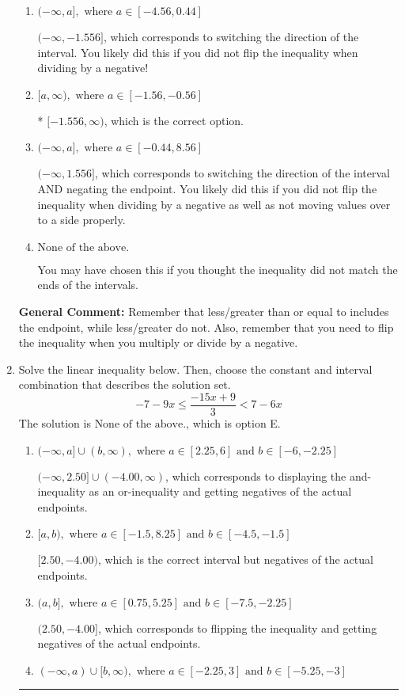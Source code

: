 \documentclass{extbook}[14pt]
\newcommand{\litem}[1]{\item #1

\rule{\textwidth}{0.4pt}}
\begin{document}
\begin{enumerate}
{\begin{enumerate}[label=\Alph*.]
 $[1.556, \infty)$, which corresponds to negating the endpoint of the solution.
\item \( (-\infty, a], \text{ where } a \in [-4.56, 0.44] \)

 $(-\infty, -1.556]$, which corresponds to switching the direction of the interval. You likely did this if you did not flip the inequality when dividing by a negative!
\item \( [a, \infty), \text{ where } a \in [-1.56, -0.56] \)

* $[-1.556, \infty)$, which is the correct option.
\item \( (-\infty, a], \text{ where } a \in [-0.44, 8.56] \)

 $(-\infty, 1.556]$, which corresponds to switching the direction of the interval AND negating the endpoint. You likely did this if you did not flip the inequality when dividing by a negative as well as not moving values over to a side properly.
\item \( \text{None of the above}. \)

You may have chosen this if you thought the inequality did not match the ends of the intervals.
\end{enumerate}

\textbf{General Comment:} Remember that less/greater than or equal to includes the endpoint, while less/greater do not. Also, remember that you need to flip the inequality when you multiply or divide by a negative.
}
\litem{
Solve the linear inequality below. Then, choose the constant and interval combination that describes the solution set.
\[ -7 - 9 x \leq \frac{-15 x + 9}{3} < 7 - 6 x \]The solution is \( \text{None of the above.} \), which is option E.\begin{enumerate}[label=\Alph*.]
\item \( (-\infty, a] \cup (b, \infty), \text{ where } a \in [2.25, 6] \text{ and } b \in [-6, -2.25] \)

$(-\infty, 2.50] \cup (-4.00, \infty)$, which corresponds to displaying the and-inequality as an or-inequality and getting negatives of the actual endpoints.
\item \( [a, b), \text{ where } a \in [-1.5, 8.25] \text{ and } b \in [-4.5, -1.5] \)

$[2.50, -4.00)$, which is the correct interval but negatives of the actual endpoints.
\item \( (a, b], \text{ where } a \in [0.75, 5.25] \text{ and } b \in [-7.5, -2.25] \)

$(2.50, -4.00]$, which corresponds to flipping the inequality and getting negatives of the actual endpoints.
\item \( (-\infty, a) \cup [b, \infty), \text{ where } a \in [-2.25, 3] \text{ and } b \in [-5.25, -3] \)


\end{enumerate}}
\end{enumerate}
\end{document}
